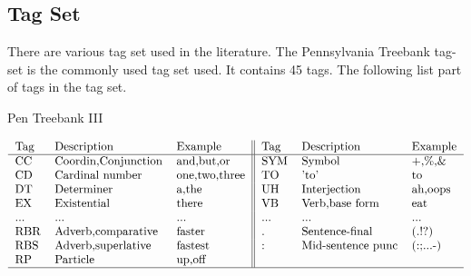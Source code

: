 \subsection{Tag Set}
There are various tag set used in the literature. The Pennsylvania Treebank tag-set is the commonly used tag set used. It contains
45 tags. The following list part of tags in the tag set.

\begin {table}
\caption {Pen Treebank III} \label{tab:title} 
\[\begin{tabular}{lll||lll}
  Tag & Description         & Example       & Tag & Description         & Example\\
  \hline                        
  CC  & Coordin,Conjunction & and,but,or    & SYM & Symbol              & +,\%,\&\\
  CD  & Cardinal number     & one,two,three & TO  & 'to'                & to\\
  DT  & Determiner          & a,the         & UH  & Interjection        & ah,oops\\
  EX  & Existential         & there         & VB  & Verb,base form      & eat\\
  ... & ...                 & ...           & ... & ...                 & ...\\
  RBR & Adverb,comparative  & faster        & .   & Sentence-final      & (.!?)\\
  RBS & Adverb,superlative  & fastest       & :   & Mid-sentence punc   & (:;...-)\\
  RP  & Particle            & up,off        &     &                     &\\
  \hline  
\end{tabular}\]
\end{table}


